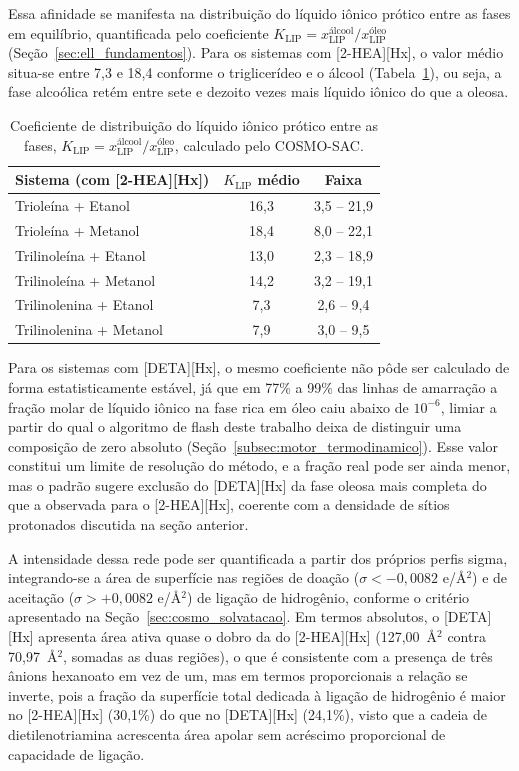 Essa afinidade se manifesta na distribuição do líquido iônico prótico entre as fases em equilíbrio, quantificada pelo coeficiente $K_{\text{LIP}} = x_{\text{LIP}}^{\text{álcool}}/x_{\text{LIP}}^{\text{óleo}}$ (Seção~\ref{sec:ell_fundamentos}). Para os sistemas com [2-HEA][Hx], o valor médio situa-se entre 7,3 e 18,4 conforme o triglicerídeo e o álcool (Tabela~\ref{tab:ki_pil}), ou seja, a fase alcoólica retém entre sete e dezoito vezes mais líquido iônico do que a oleosa.

\begin{table}[htb]
\centering
\caption{Coeficiente de distribuição do líquido iônico prótico entre as fases, $K_{\text{LIP}} = x_{\text{LIP}}^{\text{álcool}}/x_{\text{LIP}}^{\text{óleo}}$, calculado pelo COSMO-SAC.}
\label{tab:ki_pil}
\begin{tabular}{lcc}
\toprule
Sistema (com [2-HEA][Hx]) & $K_{\text{LIP}}$ médio & Faixa \\
\midrule
Trioleína + Etanol      & 16,3 & 3,5 -- 21,9 \\
Trioleína + Metanol     & 18,4 & 8,0 -- 22,1 \\
Trilinoleína + Etanol   & 13,0 & 2,3 -- 18,9 \\
Trilinoleína + Metanol  & 14,2 & 3,2 -- 19,1 \\
Trilinolenina + Etanol  & 7,3  & 2,6 -- 9,4  \\
Trilinolenina + Metanol & 7,9  & 3,0 -- 9,5  \\
\bottomrule
\end{tabular}
\end{table}

Para os sistemas com [DETA][Hx], o mesmo coeficiente não pôde ser calculado de forma estatisticamente estável, já que em 77\% a 99\% das linhas de amarração a fração molar de líquido iônico na fase rica em óleo caiu abaixo de $10^{-6}$, limiar a partir do qual o algoritmo de flash deste trabalho deixa de distinguir uma composição de zero absoluto (Seção~\ref{subsec:motor_termodinamico}). Esse valor constitui um limite de resolução do método, e a fração real pode ser ainda menor, mas o padrão sugere exclusão do [DETA][Hx] da fase oleosa mais completa do que a observada para o [2-HEA][Hx], coerente com a densidade de sítios protonados discutida na seção anterior.

A intensidade dessa rede pode ser quantificada a partir dos próprios perfis sigma, integrando-se a área de superfície nas regiões de doação ($\sigma < -0{,}0082$ e/\AA$^2$) e de aceitação ($\sigma > +0{,}0082$ e/\AA$^2$) de ligação de hidrogênio, conforme o critério apresentado na Seção~\ref{sec:cosmo_solvatacao}. Em termos absolutos, o [DETA][Hx] apresenta área ativa quase o dobro da do [2-HEA][Hx] (127,00~\AA$^2$ contra 70,97~\AA$^2$, somadas as duas regiões), o que é consistente com a presença de três ânions hexanoato em vez de um, mas em termos proporcionais a relação se inverte, pois a fração da superfície total dedicada à ligação de hidrogênio é maior no [2-HEA][Hx] (30,1\%) do que no [DETA][Hx] (24,1\%), visto que a cadeia de dietilenotriamina acrescenta área apolar sem acréscimo proporcional de capacidade de ligação.

